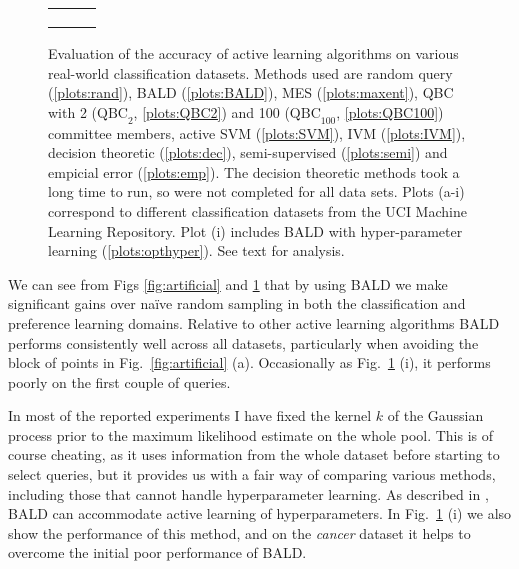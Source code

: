 \begin{figure}
	\begin{center}
	\begin{tabular}{ccc}
	&
	&
	\\
	&
	&
	\\
	&
	&
	
	\end{tabular}
	\end{center}
	\caption[Evaluation of Bayesian active learning on real-world data sets]{Evaluation of the accuracy of active learning algorithms on various real-world classification datasets. Methods used are random query (\ref{plots:rand}), BALD (\ref{plots:BALD}),  MES (\ref{plots:maxent}), QBC with 2 ($\mbox{QBC}_2$, \ref{plots:QBC2}) and 100 ($\mbox{QBC}_{100}$, \ref{plots:QBC100}) committee members, active SVM (\ref{plots:SVM}), IVM (\ref{plots:IVM}), decision theoretic \citep{Kapoor2007} (\ref{plots:dec}), semi-supervised \citep{Zhu2003} (\ref{plots:semi}) and empicial error (\ref{plots:emp}). The decision theoretic methods took a long time to run, so were not completed for all data sets. Plots (a-i) correspond to different classification datasets from the UCI Machine Learning Repository. Plot (i) includes BALD with hyper-parameter learning (\ref{plots:opthyper}). See text for analysis. \label{fig:BALD_GPC_results}}
\end{figure}

We can see from Figs \ref{fig:artificial} and \ref{fig:BALD_GPC_results} that by using BALD we make significant gains over na\"{i}ve random sampling in both the classification and preference learning domains. Relative to other active learning algorithms BALD performs consistently well across all datasets, particularly when avoiding the block of points in Fig.\ \ref{fig:artificial} (a). Occasionally \eg as Fig.\ \ref{fig:BALD_GPC_results} (i), it performs poorly on the first couple of queries.

In most of the reported experiments I have fixed the kernel $k$ of the Gaussian process prior to the maximum likelihood estimate on the whole pool. This is of course cheating, as it uses information from the whole dataset before starting to select queries, but it provides us with a fair way of comparing various methods, including those that cannot handle hyperparameter learning. As described in \citep{Houlsby2011,Houlsby2012preference}, BALD can accommodate active learning of hyperparameters. In Fig.\ \ref{fig:BALD_GPC_results} (i) we also show the performance of this method, and on the \emph{cancer} dataset it helps to overcome the initial poor performance of BALD.


